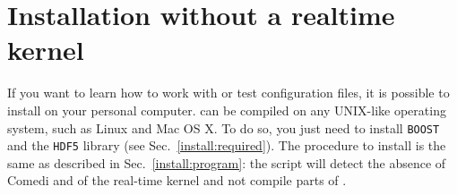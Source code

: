 \section{Installation without a realtime kernel}
\label{install:nokernel}
If you want to learn how to work with \progname or test configuration
files, it is possible to install \progname on your personal
computer. \progname can be compiled on any UNIX-like operating system,
such as Linux and Mac OS X. To do so, you just need to install
\texttt{BOOST} and the \texttt{HDF5} library (see
Sec.~\ref{install:required}). The procedure to install \progname is
the same as described in Sec.~\ref{install:program}: the
 script will detect the absence of Comedi and of
the real-time kernel and not compile parts of \progname.


